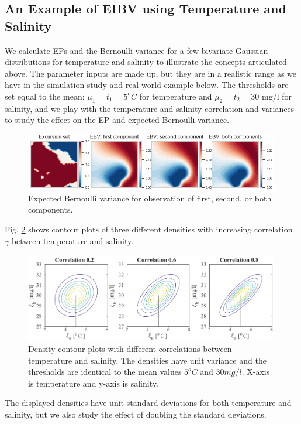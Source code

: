 \subsection{An Example of EIBV using Temperature and Salinity}
\label{Sec:UnivarEx}

We calculate EPs and the Bernoulli variance for a few bivariate
Gaussian distributions for temperature and salinity to illustrate the concepts articulated above. The parameter inputs are made up, but they are in a realistic range as we have in the simulation study and real-world example below. The thresholds are set equal to the mean; $\mu_1=t_1=5^o C$ for temperature and  $\mu_2=t_2=30$ mg/l for salinity, and we play with the temperature and salinity correlation and variances to study the effect on the EP and expected Bernoulli variance. 


\begin{figure}[h!] \centering
  \includegraphics[width=0.99\textwidth]{Figures/ebvs.png}
  \caption{Expected Bernoulli variance for observation of first, second, or both components.}
\label{illus_bivarDens}
\end{figure}


Fig. \ref{illus_bivarDens} shows contour plots of three different
densities with increasing correlation $\gamma$ between temperature and
salinity. 
\begin{figure}[h!] \centering
  \includegraphics[width=0.99\textwidth]{Figures/illus_bivar.pdf}
  \caption{Density contour plots with different correlations between
    temperature and salinity. The densities have unit variance and the
    thresholds are identical to the mean values $5^o C$ and
    $30 mg/l$. X-axis is temperature and y-axis is salinity.}
\label{illus_bivarDens}
\end{figure}
The displayed densities have unit standard deviations for both
temperature and salinity, but we also study the effect of doubling the
standard deviations.

